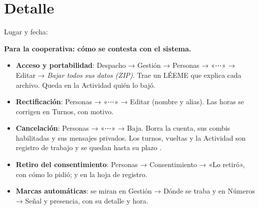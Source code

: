 \documentclass[10.5pt,a4paper]{article}
\begin{document}
\section{Detalle}
\vspace{2pt}
\llenar[\linewidth]\par\vspace{8pt}\llenar[\linewidth]\par\vspace{8pt}\llenar[\linewidth]\par\vspace{8pt}\llenar[\linewidth]

\vspace{6pt}
Lugar y fecha: \llenar[8cm]

\noindent{}\hfill{}

\vspace{14pt}
\begin{nota}
\textbf{Para la cooperativa: cómo se contesta con el sistema.}
\begin{itemize}[leftmargin=12pt,itemsep=0pt]
\item \textbf{Acceso y portabilidad}: Despacho → Gestión → Personas → «⋯» →
  Editar → \emph{Bajar todos sus datos (ZIP)}. Trae un LÉEME que explica cada
  archivo. Queda en la Actividad quién lo bajó.
\item \textbf{Rectificación}: Personas → «⋯» → Editar (nombre y alias). Las
  horas se corrigen en Turnos, con motivo.
\item \textbf{Cancelación}: Personas → «⋯» → Baja. Borra la cuenta, sus combis
  habilitadas y sus mensajes privados. Los turnos, vueltas y la Actividad son
  registro de trabajo y se quedan hasta su plazo .
\item \textbf{Retiro del consentimiento}: Personas → Consentimiento → «Lo
  retiró», con cómo lo pidió; y en la hoja de registro.
\item \textbf{Marcas automáticas}: se miran en Gestión → Dónde se traba y en
  Números → Señal y presencia, con su detalle y hora.
\end{itemize}
\end{nota}
\end{document}
